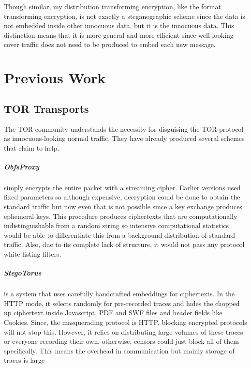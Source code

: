 \documentclass[ %
                    author={Samuel Russell},
                supervisor={Prof. Bogdan Warinschi},
                    degree={MEng},
                     title={Innocuous Ciphertexts},
                  subtitle={The DE-CENSOR Scheme},
                      type={research},
                      year={2018} ]{dissertation}
\begin{document}
Though similar, my distribution transforming encryption, like the format transforming encryption, is not exactly a steganographic scheme since the data is not embedded inside other innocuous data, but it is the innocuous data. This distinction means that it is more general and more efficient since well-looking cover traffic does not need to be produced to embed each new message.


\chapter{Previous Work}\label{chap:prev_work}

\section{TOR Transports}

The TOR community understands the necessity for disguising the TOR protocol as innocuous-looking normal traffic.
They have already produced several schemes that claim to help.

\paragraph{ObfsProxy} simply encrypts the entire packet with a streaming cipher. Earlier versions used fixed parameters so although expensive, decryption could be done to obtain the standard traffic but now even that is not possible since a key exchange produces ephemeral keys. This procedure produces ciphertexts that are computationally indistinguishable from a random string so intensive computational statistics would be able to differentiate this from a background distribution of standard traffic. Also, due to its complete lack of structure, it would not pass any protocol white-listing filters.

\paragraph{StegoTorus} is a system that uses carefully handcrafted embeddings for ciphertexts. In the HTTP mode, it selects randomly for pre-recorded traces and hides the chopped up ciphertext inside Javascript, PDF and SWF files and header fields like Cookies. Since, the masquerading protocol is HTTP, blocking encrypted protocols will not stop this. However, it relies on distributing large volumes of these traces or everyone recording their own, otherwise, censors could just block all of them specifically. This means the overhead in communication but mainly storage of traces is large
\end{document}

